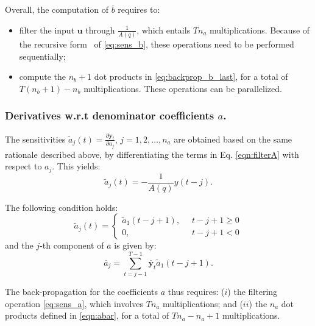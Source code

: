 \documentclass{article}
\newcommand{\q}{q} %
\newcommand{\A}{A} %
\newcommand{\ac}{a} %
\newcommand{\bb}{b} %
\newcommand{\sens}[1]{\tilde{#1}}
\newcommand{\adjoint}[1]{\overline{#1}}
\newcommand{\tvec}[1]{\mathbf{#1}}
\newcommand{\nsamp}{T}
\newcommand{\pdiff}[2]{\frac{\partial #1}{\partial #2}}
\begin{document}
Overall, the  computation of  $\adjoint{\bb}$ requires to: 
\begin{itemize}
	\item filter the input $\tvec{u}$ through $\frac{1}{A(\q)}$, which entails  $\nsamp n_\ac$ multiplications.  Because of the recursive form ~of \eqref{eq:sens_b}, these operations need  to be performed sequentially;
	\item compute 
	the $n_{\bb}\!+\!1$ dot products  in \eqref{eq:backprop_b_last}, for a total of  $\nsamp(n_{\bb}\!+\!1)- n_\bb$ multiplications. These operations can be parallelized.
\end{itemize}


\subsubsection{{Derivatives w.r.t} denominator coefficients $\ac$.} 
The   sensitivities $\sens{\ac}_j(t) = \pdiff{\tvec{y}_t}{\ac_j}$, $j=1,2,\dots,n_\ac$ are obtained based on the same rationale described above, 
by differentiating the terms in  Eq. \eqref{eqn:filterA} with respect to $\ac_j$. This yields:
\begin{equation}
\label{eq:sens_a}
\sens{\ac}_j(t) = -\frac{1}{\A(\q)}y(t-j).
\end{equation}

The following condition holds:
\begin{equation}
\label{eq:regime_a2}
\sens{\ac}_{j}(t) = \begin{cases}
\sens{\ac}_1(t-j+1), \;\;&t-j+1 \geq 0\\
0,           \;\; & t-j+1 < 0
\end{cases}
\end{equation}
and the $j$-th component of $\adjoint{\ac}$ is given by: %
\begin{equation} \label{eqn:abar}
\adjoint{\ac}_j = \sum_{t=j-1}^{\nsamp-1} \adjoint{\tvec{y}}_t \sens{a}_1(t-j+1).
\end{equation}


The back-propagation for the  coefficients $a$ thus requires: ($i$) the  filtering operation \eqref{eq:sens_a}, which involves  $\nsamp n_\ac$ multiplications; and ($ii$) 
the $n_\ac$ dot products defined in \eqref{eqn:abar}, for a total of $\nsamp n_\ac - n_\ac + 1$ multiplications. 
\end{document}
